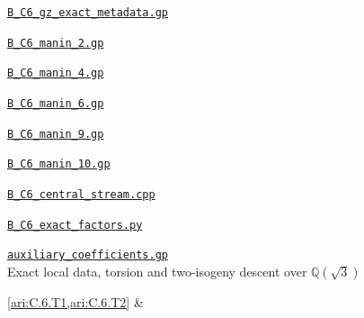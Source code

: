 \href{https://github.com/KokunoYumeto/s6-complex-structure-workbench/blob/\SsixRepositoryCommit/pro_returns/S6_10_PAPERS_checkpoint_15_20261119T1045Z/S6_10_PAPERS/code/I/replay_arithmetic/B_C6_gz_exact_metadata.gp}{\nolinkurl{B_C6_gz_exact_metadata.gp}}\par \href{https://github.com/KokunoYumeto/s6-complex-structure-workbench/blob/\SsixRepositoryCommit/pro_returns/S6_10_PAPERS_checkpoint_15_20261119T1045Z/S6_10_PAPERS/code/I/replay_arithmetic/B_C6_manin_2.gp}{\nolinkurl{B_C6_manin_2.gp}}\par \href{https://github.com/KokunoYumeto/s6-complex-structure-workbench/blob/\SsixRepositoryCommit/pro_returns/S6_10_PAPERS_checkpoint_15_20261119T1045Z/S6_10_PAPERS/code/I/replay_arithmetic/B_C6_manin_4.gp}{\nolinkurl{B_C6_manin_4.gp}}\par \href{https://github.com/KokunoYumeto/s6-complex-structure-workbench/blob/\SsixRepositoryCommit/pro_returns/S6_10_PAPERS_checkpoint_15_20261119T1045Z/S6_10_PAPERS/code/I/replay_arithmetic/B_C6_manin_6.gp}{\nolinkurl{B_C6_manin_6.gp}}\par \href{https://github.com/KokunoYumeto/s6-complex-structure-workbench/blob/\SsixRepositoryCommit/pro_returns/S6_10_PAPERS_checkpoint_15_20261119T1045Z/S6_10_PAPERS/code/I/replay_arithmetic/B_C6_manin_9.gp}{\nolinkurl{B_C6_manin_9.gp}}\par \href{https://github.com/KokunoYumeto/s6-complex-structure-workbench/blob/\SsixRepositoryCommit/pro_returns/S6_10_PAPERS_checkpoint_15_20261119T1045Z/S6_10_PAPERS/code/I/replay_arithmetic/B_C6_manin_10.gp}{\nolinkurl{B_C6_manin_10.gp}}\par \href{https://github.com/KokunoYumeto/s6-complex-structure-workbench/blob/\SsixRepositoryCommit/pro_returns/S6_10_PAPERS_checkpoint_15_20261119T1045Z/S6_10_PAPERS/code/I/replay_arithmetic/B_C6_central_stream.cpp}{\nolinkurl{B_C6_central_stream.cpp}}\par \href{https://github.com/KokunoYumeto/s6-complex-structure-workbench/blob/\SsixRepositoryCommit/pro_returns/S6_10_PAPERS_checkpoint_15_20261119T1045Z/S6_10_PAPERS/code/I/replay_arithmetic/B_C6_exact_factors.py}{\nolinkurl{B_C6_exact_factors.py}}\par \href{https://github.com/KokunoYumeto/s6-complex-structure-workbench/blob/\SsixRepositoryCommit/pro_returns/S6_10_PAPERS_checkpoint_15_20261119T1045Z/S6_10_PAPERS/code/I/replay_arithmetic/auxiliary_coefficients.gp}{\nolinkurl{auxiliary_coefficients.gp}} \\[3pt]
\hypertarget{prog:I:torsion}{}Exact local data, torsion and two-isogeny descent over $\mathbb Q(\sqrt3)$\par \cref{ari:C.6.T1,ari:C.6.T2} &
